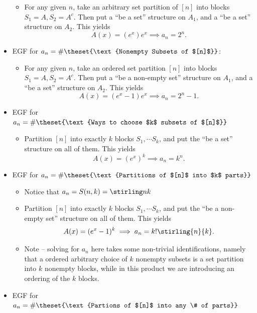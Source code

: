\begin{itemize}
  \begin{itemize}
  \tightlist
  \item
    For any given \(n\), take an arbitrary set partition of \([n]\) into
    blocks \(S_1 = A, S_2 = A^c\). Then put a ``be a set'' structure on
    \(A_1\), and a ``be a set'' structure on \(A_2\). This yields
    \[A(x) = (e^x)e^x \implies a_n = 2^n.\]
  \end{itemize}
\item
  EGF for \(a_n = \#\theset{\text{Nonempty Subsets of $[n]$}}\):

  \begin{itemize}
  \tightlist
  \item
    For any given \(n\), take an ordered set partition \([n]\) into
    blocks \(S_1 = A, S_2 = A^c\). Then put a ``be a non-empty set''
    structure on \(A_1\), and a ``be a set'' structure on \(A_2\). This
    yields \[A(x) = (e^x - 1)e^x \implies a_n = 2^n - 1.\]
  \end{itemize}
\item
  EGF for
  \(a_n = \#\theset{\text{Ways to choose $k$ subsets of $[n]$}}\)

  \begin{itemize}
  \tightlist
  \item
    Partition \([n]\) into exactly \(k\) blocks \(S_1, \cdots S_k\), and
    put the ``be a set'' structure on all of them. This yields
    \[A(x) = (e^x)^k \implies a_n = k^n.\]
  \end{itemize}
\item
  EGF for \(a_n = \#\theset{\text{Partitions of $[n]$ into $k$ parts}}\)

  \begin{itemize}
  \tightlist
  \item
    Notice that \(a_n = S(n, k) = \stirling n k\)
  \item
    Partition \([n]\) into exactly \(k\) blocks \(S_1, \cdots S_k\), and
    put the ``be a non-empty set'' structure on all of them. This yields
    \[A(x) = (e^x-1)^k \implies a_n = k! \stirling{n}{k}.\]
  \item
    Note -- solving for \(a_n\) here takes some non-trivial
    identifications, namely that a ordered arbitrary choice of \(k\)
    nonempty subsets is a set partition into \(k\) nonempty blocks,
    while in this product we are introducing an ordering of the \(k\)
    blocks.
  \end{itemize}
\item
  EGF for
  \(a_n = \#\theset{\text{Partions of $[n]$ into any \# of parts}}\)


\end{itemize}

